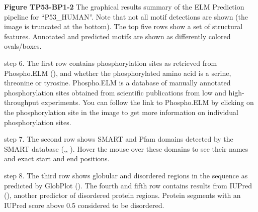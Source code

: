 \textbf{Figure TP53-BP1-2} The graphical results summary of the ELM
Prediction pipeline for ``P53\_HUMAN''. Note that not all motif
detections are shown (the image is truncated at the bottom). The top
five rows show a set of structural features. Annotated and predicted
motifs are shown as differently colored ovals/boxes.

step 6. The first row contains phosphorylation sites as retrieved from
Phospho.ELM (\cite{21062810}), and whether the phosphorylated amino acid
is a serine, threonine or tyrosine. Phospho.ELM is a database of
manually annotated phosphorylation sites obtained from scientific
publications from low and high-throughput experiments. You can follow
the link to Phospho.ELM by clicking on the phosphorylation site in the
image to get more information on individual phosphorylation sites.


step 7. The second row shows SMART and Pfam domains detected by the
SMART database (\cite{9600884},\cite{25300481}, \cite{9600884}). Hover
the mouse over these domains to see their names and exact start and end
positions.


step 8. The third row shows globular and disordered regions in the
sequence as predicted by GlobPlot (\cite{12824398}). The fourth and
fifth row contains results from IUPred (\cite{15955779}), another
predictor of disordered protein regions. Protein segments with an IUPred
score above 0.5 considered to be disordered.


